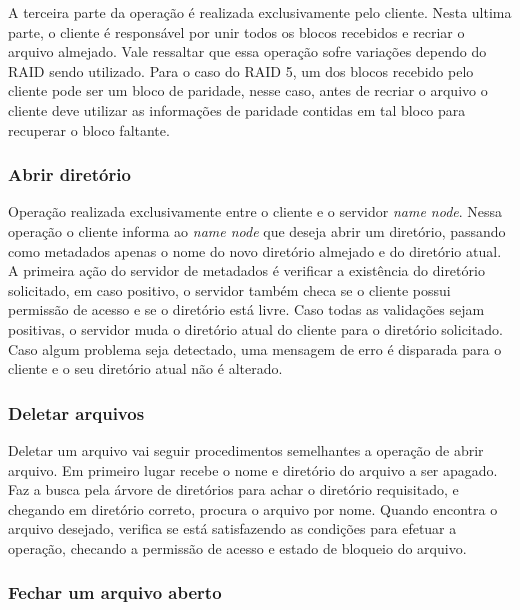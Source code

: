 	A terceira parte da operação é realizada exclusivamente pelo cliente. Nesta ultima parte, o cliente é responsável por unir todos os blocos recebidos e recriar o arquivo almejado.  Vale ressaltar que essa operação sofre variações dependo do RAID sendo utilizado. Para o caso do RAID 5, um dos blocos recebido pelo cliente pode ser um bloco de paridade, nesse caso, antes de recriar o arquivo o cliente deve utilizar as informações de paridade contidas em tal bloco para recuperar o bloco faltante.
	\\
	
	\subsubsection{Abrir diretório}
	 
	 Operação realizada exclusivamente entre o cliente e o servidor \textit{name node}. Nessa operação o cliente informa ao \textit{name node} que deseja abrir um diretório, passando como metadados apenas o nome do novo diretório almejado e do diretório atual. A primeira ação do servidor de metadados é verificar a existência do diretório solicitado, em caso positivo, o servidor também checa se o cliente possui permissão de acesso e se o diretório está livre. Caso todas as validações sejam positivas, o servidor muda o diretório atual do cliente para o diretório solicitado. Caso algum problema seja detectado, uma mensagem de erro é disparada para o cliente e o seu diretório atual não é alterado.
	 \\
	 
	\subsubsection{Deletar arquivos}
	Deletar um arquivo vai seguir procedimentos semelhantes a operação de abrir arquivo. Em primeiro lugar recebe o nome e diretório do arquivo a ser apagado. Faz a busca pela árvore de diretórios para achar o diretório requisitado, e chegando em diretório correto, procura o arquivo por nome. Quando encontra o arquivo desejado, verifica se está satisfazendo as condições para efetuar a operação, checando a permissão de acesso e estado de bloqueio do arquivo.  
	
	\subsubsection{Fechar um arquivo aberto}
	
